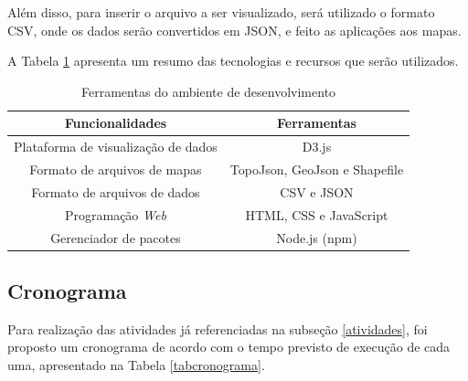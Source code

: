 \documentclass[12pt]{article}
\begin{document}
Além disso, para inserir o arquivo a ser visualizado, será utilizado o formato CSV, onde os dados serão convertidos em JSON, e feito as aplicações aos mapas.

A Tabela \ref{tabtecnologias} apresenta um resumo das tecnologias e recursos que serão utilizados.

\begin{table}[!htbp]
	\centering
    \caption{Ferramentas do ambiente de desenvolvimento}
	\begin{tabular}{|c|c|}
    \hline
    \multicolumn{1}{|c|}{{\cellcolor[rgb]{.75, .75, .75} \textbf{Funcionalidades}}} & \multicolumn{1}{|c|}{{\cellcolor[rgb]{.75, .75, .75} \textbf{Ferramentas}}}
    \tabularnewline \hline
      Plataforma de visualização de dados & D3.js \tabularnewline \hline
      Formato de arquivos de mapas & TopoJson, GeoJson e Shapefile \tabularnewline \hline
      Formato de arquivos de dados & CSV e JSON \tabularnewline \hline
      Programação \emph{Web} & HTML, CSS e JavaScript \tabularnewline \hline
      Gerenciador de pacotes & Node.js (npm) \tabularnewline \hline
	\end{tabular}
    \label{tabtecnologias}
\end{table} 

\subsection{Cronograma}

Para realização das atividades já referenciadas na subseção \ref{atividades}, foi proposto um cronograma de acordo com o tempo previsto de execução de cada uma, apresentado na Tabela \ref{tabcronograma}.

\end{document}
